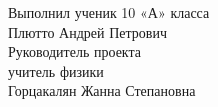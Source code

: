 \vspace*{200px}
  \begin{flushright}
    Выполнил ученик 10 «А» класса\\
    Плютто Андрей Петрович\\
    Руководитель проекта\\
    учитель физики\\
    Горцакалян Жанна Степановна\\
  \end{flushright}